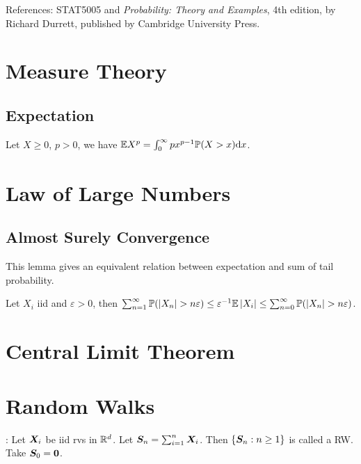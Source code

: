 \documentclass[10pt,a4paper]{article}
\begin{document}
	\MakeScribeTop
	\tableofcontents


References: STAT5005 and \textit{Probability: Theory and Examples}, 4th edition, by Richard Durrett, published by Cambridge University Press.

\section{Measure Theory}\label{sec:measure}

\subsection{Expectation}\label{sec:measure-expectation}
\begin{lemma}\label{lamma:measure-expectation-expInt}
	Let $X\geq 0$, $p>0$, we have $\bbE X^p=\int_{0}^{\infty }px^{p-1}\bbP(X>x) \rmd x$.
\end{lemma}


\section{Law of Large Numbers}\label{sec:LLN}




\subsection{Almost Surely Convergence}\label{sec:LLN-AS}

This lemma gives an equivalent relation between expectation and sum of tail probability.
\begin{lemma}\label{lemma:LLN-AS-expectation-sumTail}
	Let $X_i$ iid and $\varepsilon>0$, then $\sum_{n=1}^{\infty } \bbP(\abs{X_n}>n\varepsilon) \leq \varepsilon^{-1}\bbE\abs{X_i} \leq  \sum_{n=0}^\infty \bbP(\abs{X_n}>n\varepsilon)$.  
\end{lemma}


\section{Central Limit Theorem}\label{sec:CLT}

\section{Random Walks}\label{sec:RW}
: Let $\X_i$ be iid rvs in $\bbR^d$. Let $\S_n=\sum_{i=1}^{n}\X_i$. Then $\{\S_n:n\geq 1\}$ is called a RW. Take $\S_0=\0$.  
\end{document}
